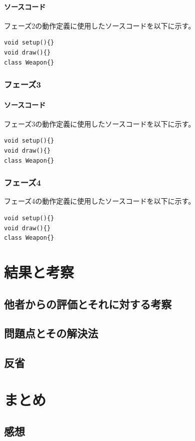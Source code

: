 \documentclass[a4paper,titlepage,11pt]{ltjsarticle}
\begin{document}
\paragraph{ソースコード}
フェーズ2の動作定義に使用したソースコードを以下に示す。
\begin{lstlisting}
void setup(){}
void draw(){}
class Weapon{}
\end{lstlisting}
\subsubsection{フェーズ3}
\paragraph{ソースコード}
フェーズ3の動作定義に使用したソースコードを以下に示す。
\begin{lstlisting}
void setup(){}
void draw(){}
class Weapon{}
\end{lstlisting}
\subsubsection{フェーズ4}
フェーズ4の動作定義に使用したソースコードを以下に示す。
\begin{lstlisting}
void setup(){}
void draw(){}
class Weapon{}
\end{lstlisting}
\section{結果と考察}
\subsection{他者からの評価とそれに対する考察}
\subsection{問題点とその解決法}
\subsection{反省}
\section{まとめ}
\subsection{感想}
\end{document}
